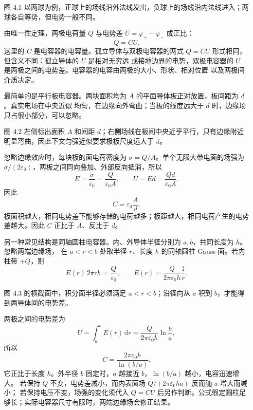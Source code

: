 图 4.1 以两球为例，正球上的场线沿外法线发出，负球上的场线沿内法线进入；两球各自等势，但电势一般不同。

\capacitorFieldFigure
{}

由唯一性定理，两极电荷量 $Q$ 与电势差 $U=\varphi_+-\varphi_-$ 成正比：
\begin{equation}
  \boxed{Q=CU}.
\end{equation}
这里的 $C$ 是电容器的电容量。孤立导体与双极电容器的两式 $Q=CU$ 形式相同，但含义不同：孤立导体的 $U$ 是相对无穷远
或接地边界的电势，双极电容器的 $U$ 是两极之间的电势差。电容器的电容由两极的大小、形状、相对位置
以及两极间介质决定。

最简单的是平行板电容器。两块面积均为 $A$ 的平面导体板正对放置，板间距为 $d$。真实电场在中央近似
均匀，在边缘向外弯曲；当板的线度远大于 $d$ 时，边缘场只占很小部分，可以忽略。

图 4.2 左侧标出面积 $A$ 和间距 $d$；右侧场线在板间中央近乎平行，只有边缘附近明显弯曲，因此下文匀强近似要求极板尺度远大于 $d$。

\parallelPlateFigure
{}

忽略边缘效应时，每块板的面电荷密度为 $\sigma=Q/A$。单个无限大带电面的场强为
$\sigma/(2\varepsilon_0)$，两板之间同向叠加、外部反向抵消，所以
\[
  E=\frac{\sigma}{\varepsilon_0}=\frac{Q}{\varepsilon_0A},\qquad
  U=Ed=\frac{Qd}{\varepsilon_0A}.
\]
因此
\begin{equation}
  \boxed{C=\varepsilon_0\frac Ad}.
\end{equation}
板面积越大，相同电势差下能够存储的电荷越多；板距越大，相同电荷产生的电势差越大。因此 $C$ 正比于
$A$、反比于 $d$。

另一种常见结构是同轴圆柱电容器。内、外导体半径分别为 $a,b$，共同长度为 $h$。忽略两端边缘场，
在 $a<r<b$ 处取半径 $r$、长度 $h$ 的同轴圆柱 Gauss 面。若内柱带 $+Q$，则
\[
  E(r)\,2\pi rh=\frac{Q}{\varepsilon_0},\qquad
  E(r)=\frac{Q}{2\pi\varepsilon_0h}\frac1r.
\]

图 4.3 的横截面中，积分面半径必须满足 $a<r<b$；沿径向从 $a$ 积到 $b$，才能得到两导体间的电势差。

\coaxialCapacitorFigure
{}

两极之间的电势差为
\[
  U=\int_a^bE(r)\,\mathrm dr
   =\frac{Q}{2\pi\varepsilon_0h}\ln\frac ba,
\]
所以
\begin{equation}
  \boxed{C=\frac{2\pi\varepsilon_0h}{\ln(b/a)}}.
\end{equation}
它正比于长度 $h$。外半径 $b$ 固定时，$a$ 越接近 $b$，$\ln(b/a)$ 越小，电容迅速增大。
若保持 $Q$ 不变，电势差减小，而内表面场 $Q/(2\pi\varepsilon_0ha)$ 反而随 $a$ 增大而减小；
若保持电压不变，场强的变化须代入 $Q=CU$ 后另作判断。公式假定圆柱足够长；实际电容器尺寸有限时，两端边缘场会修正结果。

